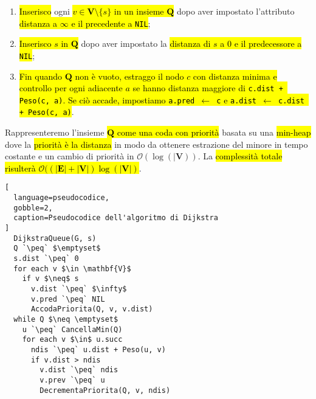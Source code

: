 \documentclass[a4paper,11pt,oneside]{article}
\theoremstyle{plain}
\theoremstyle{definition}
\theoremstyle{remark}
\newcommand{\peq}{$\gets$}
\begin{document}
\begin{enumerate}
  \item \hl{Inserisco} ogni \hl{$v \in \mathbf{V} \setminus \{s\}$ in un insieme
    $\mathbf{Q}$} dopo aver impostato l'attributo \hl{distanza a $\infty$ e il
    precedente a \texttt{NIL}};
  \item \hl{Inserisco $s$ in $\mathbf{Q}$} dopo aver impostato la \hl{distanza
    di $s$ a 0 e il predecessore a \texttt{NIL}};
  \item \hl{Fin quando $\mathbf{Q}$ non è vuoto, estraggo il nodo $c$ con
    distanza minima e controllo per ogni adiacente $a$ se hanno distanza
    maggiore di \texttt{c.dist + Peso(c, a)}. Se ciò accade, impostiamo
    \texttt{a.pred \peq{} c} e \texttt{a.dist \peq{} c.dist + Peso(c, a)}}.
\end{enumerate}

\noindent Rappresenteremo l'insieme \hl{$\mathbf{Q}$ come una coda con priorità}
basata su una \hl{min-heap} dove la \hl{priorità è la distanza} in modo da
ottenere estrazione del minore in tempo costante e un cambio di priorità in
$\mathcal{O}(\log(|\mathbf{V}))$. La \hl{complessità totale risulterà
$\mathcal{O}((|\mathbf{E}| + |\mathbf{V}|)\log(|\mathbf{V}|)$}.

\begin{lstlisting}[
  language=pseudocodice,
  gobble=2,
  caption=Pseudocodice dell'algoritmo di Dijkstra
]
  DijkstraQueue(G, s)
  Q `\peq` $\emptyset$
  s.dist `\peq` 0
  for each v $\in \mathbf{V}$
    if v $\neq$ s
      v.dist `\peq` $\infty$
      v.pred `\peq` NIL
      AccodaPriorita(Q, v, v.dist)
  while Q $\neq \emptyset$
    u `\peq` CancellaMin(Q)
    for each v $\in$ u.succ
      ndis `\peq` u.dist + Peso(u, v)
      if v.dist > ndis
        v.dist `\peq` ndis
        v.prev `\peq` u
        DecrementaPriorita(Q, v, ndis)
\end{lstlisting}
\end{document}

